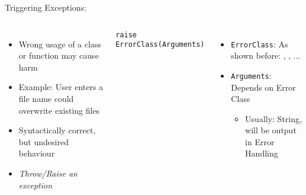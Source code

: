 
\begin{frame}[fragile]{Triggering Exceptions: }
%
\begin{columns}[T]
\begin{itemize}
\item Wrong usage of a class or function may cause harm
\item Example: User enters a file name \Thus could overwrite existing files
\item Syntactically correct, but undesired behaviour
\item[\Thus] \emph{Throw/Raise an exception}
\end{itemize}
%
\begin{codebox}
\begin{verbatim}
raise ErrorClass(Arguments)
\end{verbatim}
\end{codebox}
%
\begin{itemize}
\item \texttt{ErrorClass}: As shown before: , , ...
\item \texttt{Arguments}: Depends on Error Class
	\begin{itemize}
	\item Usually: String, will be output in Error Handling
	\end{itemize}
\end{itemize}
\end{columns}
%
\end{frame}


